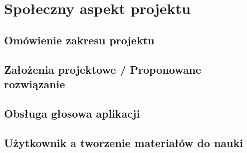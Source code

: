 \chapter{Społeczny aspekt projektu}

\section{Omówienie zakresu projektu}
\section{Założenia projektowe / Proponowane rozwiązanie}
\section{Obsługa głosowa aplikacji}
\section{Użytkownik a tworzenie materiałów do nauki}
